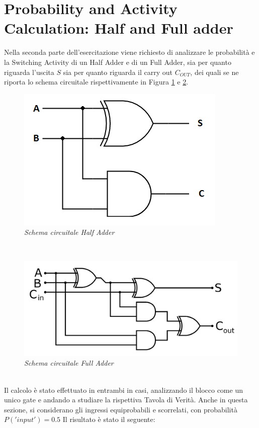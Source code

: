 \section{Probability and Activity Calculation: Half and Full adder}
Nella seconda parte dell'esercitazione viene richiesto di analizzare le probabilità e la Switching Activity di un Half Adder e di un Full Adder, sia per quanto riguarda l'uscita $S$ sia per quanto riguarda il carry out $C_{OUT}$, dei quali se ne riporta lo schema circuitale rispettivamente in Figura \ref{half_adder} e \ref{full_adder}.
\begin{figure}[!htb]
	\centering
	\includegraphics[scale=0.4]{immagini/half_adder}
	\caption{\textit{Schema circuitale Half Adder}}
	\label{half_adder}
\end{figure} \\
\begin{figure}[!htb]
	\centering
	\includegraphics[scale=0.2]{immagini/full_adder}
	\caption{\textit{Schema circuitale Full Adder}}
	\label{full_adder}
\end{figure} \\
Il calcolo è stato effettuato in entrambi in casi, analizzando il blocco come un unico gate e andando a studiare la rispettiva Tavola di Verità. Anche in questa sezione, si considerano gli ingressi equiprobabili e scorrelati, con probabilità $P('input')=0.5$ Il risultato è stato il seguente:\\
